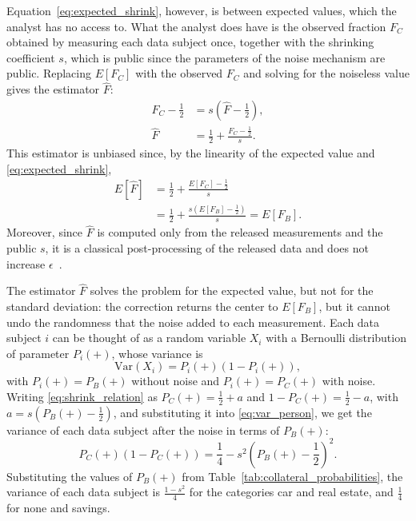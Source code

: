 \documentclass{ieeeaccess}
\begin{document}
Equation~\eqref{eq:expected_shrink}, however, is between expected values, which the analyst has no access to. What the analyst does have is the observed fraction $F_C$ obtained by measuring each data subject once, together with the shrinking coefficient $s$, which is public since the parameters of the noise mechanism are public. Replacing $E[F_C]$ with the observed $F_C$ and solving for the noiseless value gives the estimator $\hat{F}$:
\begin{align}
  F_C - \tfrac{1}{2} &= s\left(\hat{F} - \tfrac{1}{2}\right), \nonumber \\
  \hat{F} &= \frac{1}{2} + \frac{F_C - \frac{1}{2}}{s}.
  \label{eq:estimator}
\end{align}
This estimator is unbiased since, by the linearity of the expected value and \eqref{eq:expected_shrink},
\begin{align}
  E[\hat{F}] &= \frac{1}{2} + \frac{E[F_C] - \frac{1}{2}}{s} \nonumber \\
  &= \frac{1}{2} + \frac{s\left(E[F_B] - \frac{1}{2}\right)}{s} = E[F_B].
  \label{eq:unbiased}
\end{align}
Moreover, since $\hat{F}$ is computed only from the released measurements and the public $s$, it is a classical post-processing of the released data and does not increase $\epsilon$~\cite[Prop.~2.1]{dwork2014algorithmic}.

The estimator $\hat{F}$ solves the problem for the expected value, but not for the standard deviation: the correction returns the center to $E[F_B]$, but it cannot undo the randomness that the noise added to each measurement. Each data subject $i$ can be thought of as a random variable $X_i$ with a Bernoulli distribution of parameter $P_i(+)$, whose variance is
\begin{equation}
  \mathrm{Var}(X_i) = P_i(+)\left(1 - P_i(+)\right),
  \label{eq:var_person}
\end{equation}
with $P_i(+) = P_B(+)$ without noise and $P_i(+) = P_C(+)$ with noise. Writing \eqref{eq:shrink_relation} as $P_C(+) = \frac{1}{2} + a$ and $1 - P_C(+) = \frac{1}{2} - a$, with $a = s\left(P_B(+) - \frac{1}{2}\right)$, and substituting it into \eqref{eq:var_person}, we get the variance of each data subject after the noise in terms of $P_B(+)$:
\begin{equation}
  P_C(+)\left(1 - P_C(+)\right) = \frac{1}{4} - s^2\left(P_B(+) - \frac{1}{2}\right)^2.
  \label{eq:var_person_c}
\end{equation}
Substituting the values of $P_B(+)$ from Table~\ref{tab:collateral_probabilities}, the variance of each data subject is $\frac{1-s^2}{4}$ for the categories car and real estate, and $\frac{1}{4}$ for none and savings.
\end{document}
